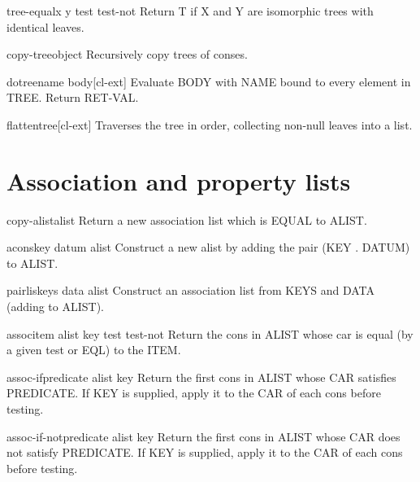 \documentclass[10pt,english]{book}
\begin{document}
\begin{function}{tree-equal}{x y \key test test-not}
  Return T if X and Y are isomorphic trees with identical leaves.
\end{function}

\begin{function}{copy-tree}{object}
  Recursively copy trees of conses.
\end{function}

\begin{macro}{dotree}{name \body body}[cl-ext]
  Evaluate BODY with NAME bound to every element in TREE. Return RET-VAL.
\end{macro}

\begin{function}{flatten}{tree}[cl-ext]
  Traverses the tree in order, collecting non-null leaves into a list.
\end{function}

\section{Association and property lists}
\label{sec:association-lists}

\begin{function}{copy-alist}{alist}
  Return a new association list which is EQUAL to ALIST.
\end{function}

\begin{function}{acons}{key datum alist}
  Construct a new alist by adding the pair (KEY . DATUM) to ALIST.
\end{function}

\begin{function}{pairlis}{keys data \op alist}
  Construct an association list from KEYS and DATA (adding to ALIST).
\end{function}

\begin{function}{assoc}{item alist \key key test test-not}
  Return the cons in ALIST whose car is equal (by a given test or EQL) to
   the ITEM.
\end{function}

\begin{function}{assoc-if}{predicate alist \key key}
  Return the first cons in ALIST whose CAR satisfies PREDICATE. If
   KEY is supplied, apply it to the CAR of each cons before testing.
\end{function}

\begin{function}{assoc-if-not}{predicate alist \key key}
  Return the first cons in ALIST whose CAR does not satisfy PREDICATE.
  If KEY is supplied, apply it to the CAR of each cons before testing.
\end{function}
\end{document}
